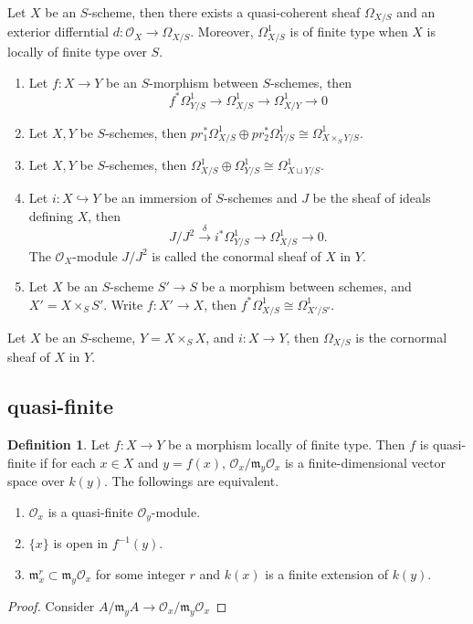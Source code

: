 \documentclass[leqno]{amsart}
\newcommand{\oo}{\mathcal O}
\newcommand{\1}{\mathbf{1}}
\newcommand{\fm}{\mathfrak m}
\theoremstyle{definition}
\newtheorem{defn}[thm]{Definition}
\theoremstyle{remark}
\begin{document}
Let $X$ be an  $S$-scheme,
then there exists a quasi-coherent sheaf
$\Omega_{X/S}$ and an exterior differntial
$d\colon \oo_X\to \Omega_{X/S}$.
Moreover, $\Omega^1_{X/S}$ is of finite type
when $X$ is locally of finite type over  $S$.
\begin{enumerate}[label=(\alph*)]
	\item Let $f\colon X\to Y$
	be an $S$-morphism between $S$-schemes, then
	\[ 
		f^*\Omega^1_{Y/S}\to \Omega^1_{X/S}
		\to\Omega^1_{X/Y}\to 0
	\]
	\item Let $X, Y$ be  $S$-schemes, then
	 $pr_1^*\Omega^1_{X/S}\oplus pr_2^*\Omega^1_{Y/S}
	 \cong \Omega^1_{X\times_SY/S}$.
	\item Let $X, Y$ be  $S$-schemes, then
	$\Omega^1_{X/S}\oplus \Omega^1_{Y/S}
	\cong \Omega^1_{X\sqcup Y/S}$.
	\item Let $i\colon X\hookrightarrow Y$ be an immersion
	of  $S$-schemes and  $J$ be the sheaf of ideals
	defining  $X$, then
	\[
		J/J^2\xrightarrow{\delta}
		i^*\Omega^1_{Y/S}\to \Omega^1_{X/S}\to 0.
	\]
	The $\oo_X$-module  $J/J^2$ is called
	the conormal sheaf of  $X$ in  $Y$.
	\item Let $X$ be an $S$-scheme
	$S'\to S$ be a morphism between schemes,
	and $X'=X\times_SS'$.
	Write $f\colon X'\to X$,
	then $f^*\Omega^1_{X/S}\cong \Omega^1_{X'/S'}$.
\end{enumerate}
Let $X$ be an $S$-scheme, 
$Y=X\times_SX$, and $i\colon X\to Y$,
then $\Omega_{X/S}$ is the cornormal sheaf of
$X$ in $Y$.

\subsection{quasi-finite}

\begin{defn}
	Let $f\colon X\to Y$ be a morphism locally of finite type.
	Then  $f$ is quasi-finite if 
	for each  $x\in X$ and  $y=f(x)$,
	$\oo_x/\fm_y\oo_x$ is a finite-dimensional vector space
	over  $k(y)$.
	The followings are equivalent.
	 \begin{enumerate}[label=(\alph*)]
		\item $\oo_x$ is a quasi-finite $\oo_y$-module.
		\item  $ \{x\}$ is open in $f^{-1}(y)$.
		\item $\fm_x^r\subset \fm_y\oo_x$ for
			some integer $r$ and 
			$k(x)$ is a finite extension of $k(y)$.
	\end{enumerate}
\end{defn}
\begin{proof}
	Consider $A/\fm_yA\to \oo_x/\fm_y\oo_x$
\end{proof}
\end{document}
